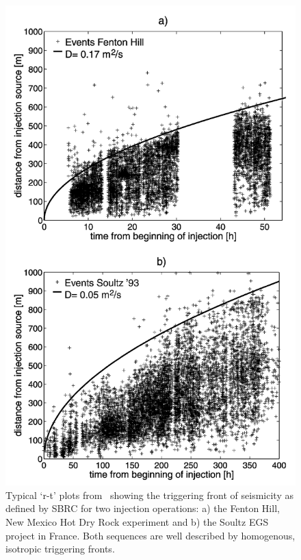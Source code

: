 \begin{figure}[h!]
\begin{center}
\includegraphics[width=0.70\columnwidth]{Chapter_1_Intro/figures/Shapiro_2002_SBRC_fig2/Shapiro_2002_SBRC_fig2}
\caption[Example `r-t' plot modified from \citet{Shapiro_2002}]{{
Typical `r-t' plots from~\protect\citet{Shapiro_2002} showing the triggering front
of seismicity as defined by SBRC for two injection operations: a) the
Fenton Hill, New Mexico Hot Dry Rock experiment and b) the Soultz EGS
project in France. Both sequences are well described by homogenous,
isotropic triggering fronts.
{\label{182804}}%
}}
\end{center}
\end{figure}

